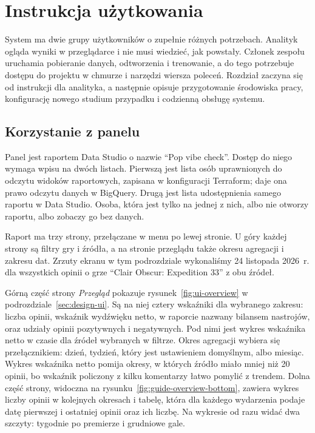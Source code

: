 \chapter{Instrukcja użytkowania}
\label{chap:user-guide}


System ma dwie grupy użytkowników o zupełnie różnych potrzebach.
Analityk ogląda wyniki w przeglądarce i nie musi wiedzieć, jak powstały.
Członek zespołu uruchamia pobieranie danych, odtworzenia i trenowanie, a do tego potrzebuje dostępu do projektu w chmurze i narzędzi wiersza poleceń.
Rozdział zaczyna się od instrukcji dla analityka, a następnie opisuje przygotowanie środowiska pracy, konfigurację nowego studium przypadku i codzienną obsługę systemu.

\section{Korzystanie z panelu}
\label{sec:guide-dashboard}

Panel jest raportem Data Studio o nazwie \enquote{Pop vibe check}.
Dostęp do niego wymaga wpisu na dwóch listach.
Pierwszą jest lista osób uprawnionych do odczytu widoków raportowych, zapisana w konfiguracji Terraform; daje ona prawo odczytu danych w BigQuery.
Drugą jest lista udostępnienia samego raportu w Data Studio.
Osoba, która jest tylko na jednej z nich, albo nie otworzy raportu, albo zobaczy go bez danych.

Raport ma trzy strony, przełączane w menu po lewej stronie.
U góry każdej strony są filtry gry i źródła, a na stronie przeglądu także okresu agregacji i zakresu dat.
Zrzuty ekranu w tym podrozdziale wykonaliśmy 24 listopada 2026~r. dla wszystkich opinii o grze \enquote{Clair Obscur: Expedition 33} z obu źródeł.

Górną część strony \emph{Przegląd} pokazuje rysunek~\ref{fig:ui-overview} w podrozdziale~\ref{sec:design-ui}.
Są na niej cztery wskaźniki dla wybranego zakresu: liczba opinii, wskaźnik wydźwięku netto, w raporcie nazwany bilansem nastrojów, oraz udziały opinii pozytywnych i negatywnych.
Pod nimi jest wykres wskaźnika netto w czasie dla źródeł wybranych w filtrze.
Okres agregacji wybiera się przełącznikiem: dzień, tydzień, który jest ustawieniem domyślnym, albo miesiąc.
Wykres wskaźnika netto pomija okresy, w których źródło miało mniej niż 20 opinii, bo wskaźnik policzony z kilku komentarzy łatwo pomylić z trendem.
Dolna część strony, widoczna na rysunku~\ref{fig:guide-overview-bottom}, zawiera wykres liczby opinii w kolejnych okresach i tabelę, która dla każdego wydarzenia podaje datę pierwszej i ostatniej opinii oraz ich liczbę.
Na wykresie od razu widać dwa szczyty: tygodnie po premierze i grudniowe gale.

